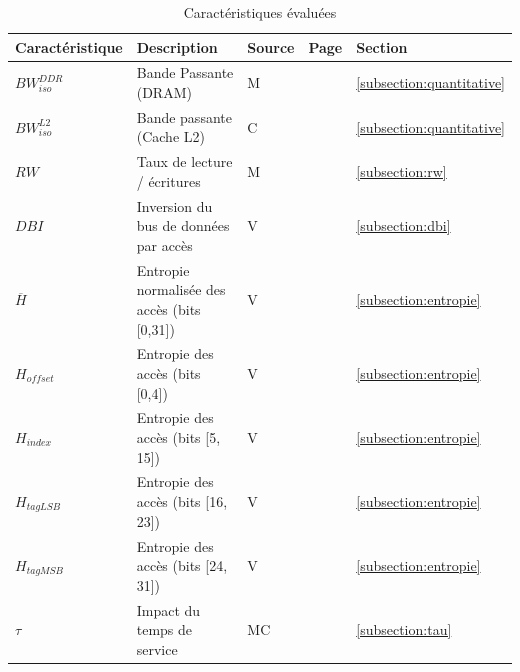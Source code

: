 \begin{table}
\centering
	\renewcommand{\arraystretch}{1.3}

\begin{tabular}{l l l l l}
	\toprule
    \textbf{Caractéristique} 	  & \textbf{Description} 				  & \textbf{Source} & \textbf{Page} & \textbf{Section} \\
	\midrule
	 $BW_{iso}^{DDR}$ & Bande Passante (DRAM) 				  		& M  & \pageref{subsection:quantitative} & \ref{subsection:quantitative} \\
	 $BW_{iso}^{L2}$  & Bande passante (Cache L2) 			  		& C  & \pageref{subsection:quantitative}& \ref{subsection:quantitative} \\
	 $RW$ 			  & Taux de lecture / écritures 		  		& M  & \pageref{subsection:rw} & \ref{subsection:rw} \\
	 $DBI$ 			  & Inversion du bus de données par accès 		& V  & \pageref{subsection:dbi} & \ref{subsection:dbi} \\
	 $\overline{H}$   & Entropie normalisée des accès (bits [0,31]) & V  & \pageref{subsection:entropie} & \ref{subsection:entropie} \\
	 $H_{offset}$ 	  & Entropie des accès (bits [0,4])	 	  		& V  & \pageref{subsection:entropie}& \ref{subsection:entropie} \\
	 $H_{index}$  	  & Entropie des accès (bits [5, 15])  	  		& V  & \pageref{subsection:entropie} & \ref{subsection:entropie}\\
	 $H_{tagLSB}$ 	  & Entropie des accès (bits [16, 23]) 	  		& V  & \pageref{subsection:entropie} & \ref{subsection:entropie}\\
	 $H_{tagMSB}$ 	  & Entropie des accès (bits [24, 31]) 	  		& V  & \pageref{subsection:entropie} & \ref{subsection:entropie}\\
     $\tau$  		  & Impact du temps de service 			  		& MC & \pageref{subsection:tau} & \ref{subsection:tau}\\
	\bottomrule
\end{tabular}
\caption{\label{table:feature_description}Caractéristiques évaluées}
\end{table}

